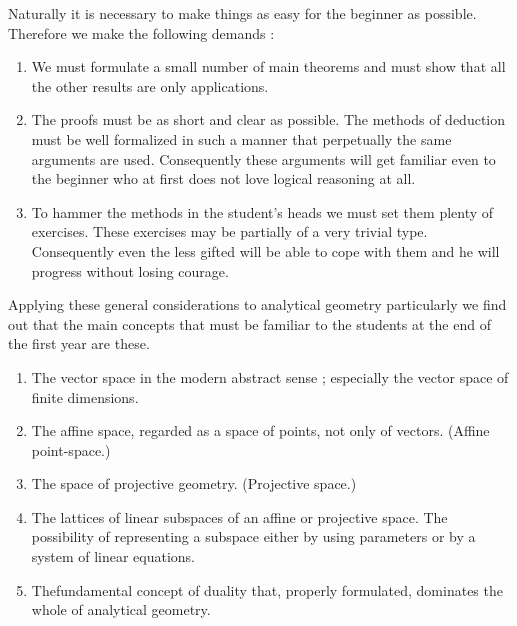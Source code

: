 Naturally it is necessary to make things as easy for the beginner as
possible. Therefore we make the following demands :
\begin{enumerate}
\item We must formulate a small number of main theorems and must show
  that all the other results are only applications.

\item The proofs must be as short and clear as possible. The methods
  of deduction must be well formalized in such a manner that
  perpetually the same arguments are used.  Consequently these
  arguments will get familiar even to the beginner who at first does
  not love logical reasoning at all.

\item To hammer the methods in the student's heads we must set them
  plenty of exercises. These exercises may be partially of a very
  trivial type. Consequently even the less gifted will be able to cope
  with them and he will progress without losing courage.
\end{enumerate}

Applying these general considerations to analytical geometry
particularly we find out that the main concepts that must be familiar
to the students at the end of the first year are these.
\begin{enumerate}
\item The vector space in the modern abstract sense ; especially the
  vector space of finite dimensions. 

\item The affine space, regarded as a space of points, not only of
  vectors. (Affine point-space.)

\item The space of projective geometry. (Projective space.)


\item The lattices of linear subspaces of an affine or projective
  space. The possibility of representing a subspace either by using
  parameters or by a system of linear equations.

\item The\pageoriginale fundamental concept of duality that, properly
  formulated, dominates the whole of analytical geometry.
\end{enumerate}

